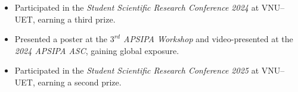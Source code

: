 \documentclass[a4paper,9pt]{extarticle}
\begin{document}

\begin{itemize}
    \item Participated in the \textit{Student Scientific Research Conference 2024} at VNU--UET, earning a third prize.
    \item Presented a poster at the \textit{\(3^{rd}\) APSIPA Workshop} and video-presented at the \textit{2024 APSIPA ASC}, gaining global exposure.
    \item Participated in the \textit{Student Scientific Research Conference 2025} at VNU--UET, earning a second prize.
\end{itemize}


\end{document}
